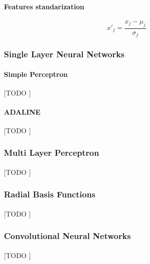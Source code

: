 \documentclass{article}
\begin{document}
			\paragraph{Features standarization}

			\begin{equation*}
				x'_j = \frac{x_j - \mu_j}{\sigma_j}
			\end{equation*}


			\subsubsection{Single Layer Neural Networks}
			\label{sec:single-layer-nn}


				\paragraph{Simple Perceptron}
				\label{sec:perceptron}
				[TODO ]

				\paragraph{ADALINE}
				\label{sec:adaline}
				[TODO ]

			\subsubsection{Multi Layer Perceptron}
			\label{sec:mlp}

				\paragraph{}
				[TODO ]

			\subsubsection{Radial Basis Functions}
			\label{sec:rbf}

				\paragraph{}
				[TODO ]

			\subsubsection{Convolutional Neural Networks}
			\label{sec:cnn}

				\paragraph{}
				[TODO ]
\end{document}
